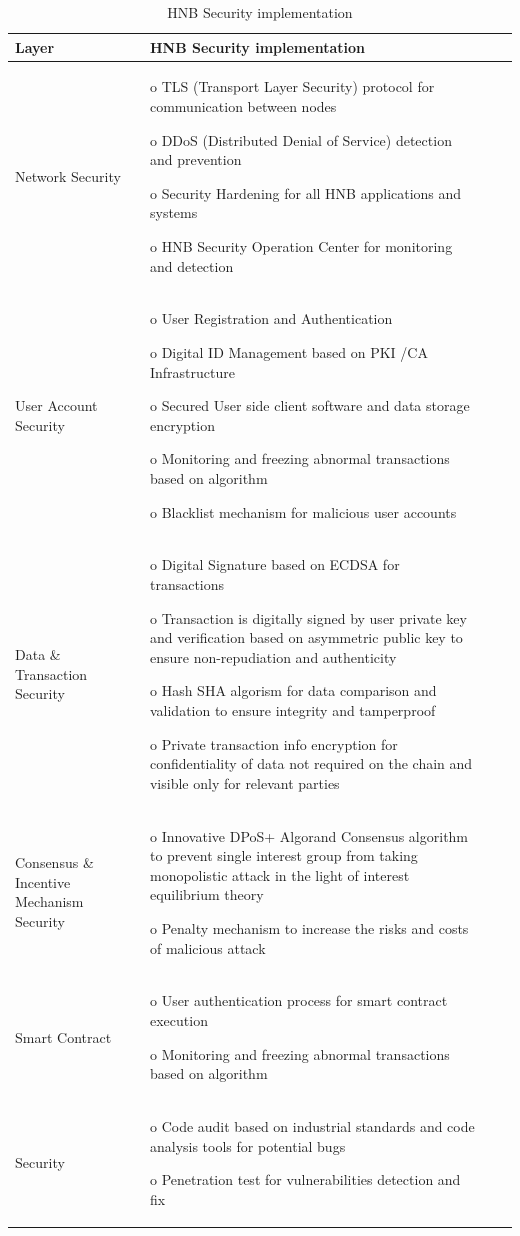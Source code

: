 \documentclass[fleqn,10pt]{SelfArx} %
\begin{document}
\begin{table}[hbt]
\caption{HNB Security implementation}
\centering
\begin{tabular}{lp{11cm}p{2cm}r}
\toprule
Layer
 & 
HNB Security implementation\\
\midrule
Network
Security
&
o	TLS (Transport Layer Security) protocol for communication between nodes

o	DDoS (Distributed Denial of Service) detection and prevention

o	Security Hardening for all HNB applications and systems

o	HNB Security Operation Center for monitoring and detection
\\
\midrule
User Account Security
 & 
o	User Registration and Authentication

o	Digital ID Management based on PKI /CA Infrastructure

o	Secured User side client software and data storage encryption

o	Monitoring and freezing abnormal transactions based on algorithm

o	Blacklist mechanism for malicious user accounts
\\
\midrule
Data \& Transaction Security
 & 
o	Digital Signature based on ECDSA for transactions

o	Transaction is digitally signed by user private key and verification based on asymmetric public key to ensure non-repudiation and authenticity

o	Hash SHA algorism for data comparison and validation to ensure integrity and tamperproof

o	Private transaction info encryption for confidentiality of data not required on the chain and visible only for relevant parties
\\
\midrule
Consensus \& Incentive Mechanism Security
&
o	Innovative DPoS+ Algorand Consensus algorithm to prevent single interest group from taking monopolistic attack in the light of interest equilibrium theory

o	Penalty mechanism to increase the risks and costs of malicious attack
\\
\midrule
Smart Contract
 & 
o	User authentication process for smart contract execution

o	Monitoring and freezing abnormal transactions based on algorithm

\\
\midrule
Security
 & 
o	Code audit based on industrial standards and code analysis tools for potential bugs 

o	Penetration test for vulnerabilities detection and fix

\\
\midrule
\bottomrule
\end{tabular}
\label{tab:label}
\end{table}
\end{document}
